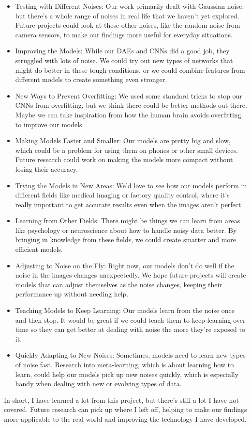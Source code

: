 \begin{itemize}[label=$\bullet$]
    \item Testing with Different Noises: Our work primarily dealt with Gaussian noise, but there's a whole range of noises in real life that we haven't yet explored. Future projects could look at these other noises, like the random noise from camera sensors, to make our findings more useful for everyday situations.

    \item Improving the Models: While our DAEs and CNNs did a good job, they struggled with lots of noise. We could try out new types of networks that might do better in these tough conditions, or we could combine features from different models to create something even stronger.

    \item New Ways to Prevent Overfitting: We used some standard tricks to stop our CNNs from overfitting, but we think there could be better methods out there. Maybe we can take inspiration from how the human brain avoids overfitting to improve our models.

    \item Making Models Faster and Smaller: Our models are pretty big and slow, which could be a problem for using them on phones or other small devices. Future research could work on making the models more compact without losing their accuracy.

    \item Trying the Models in New Areas: We'd love to see how our models perform in different fields like medical imaging or factory quality control, where it's really important to get accurate results even when the images aren't perfect.

    \item Learning from Other Fields: There might be things we can learn from areas like psychology or neuroscience about how to handle noisy data better. By bringing in knowledge from these fields, we could create smarter and more efficient models.

    \item Adjusting to Noise on the Fly: Right now, our models don't do well if the noise in the images changes unexpectedly. We hope future projects will create models that can adjust themselves as the noise changes, keeping their performance up without needing help.

    \item Teaching Models to Keep Learning: Our models learn from the noise once and then stop. It would be great if we could teach them to keep learning over time so they can get better at dealing with noise the more they're exposed to it.

    \item Quickly Adapting to New Noises: Sometimes, models need to learn new types of noise fast. Research into meta-learning, which is about learning how to learn, could help our models pick up new noises quickly, which is especially handy when dealing with new or evolving types of data.
\end{itemize}

In short, I have learned a lot from this project, but there's still a lot I have not covered. Future research can pick up where I left off, helping to make our findings more applicable to the real world and improving the technology I have developed.